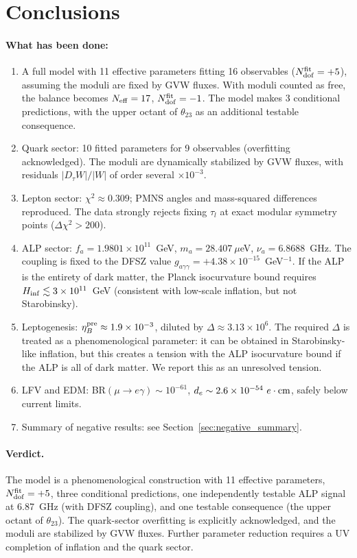 \documentclass[12pt,a4paper]{article}
\numberwithin{equation}{section}
\begin{document}
\section{Conclusions}
\paragraph{What has been done:}
\begin{enumerate}[leftmargin=1.5em]
\item A full model with 11 effective parameters fitting 16 observables (\(N_{\rm dof}^{\rm fit} = +5\)), assuming the moduli are fixed by GVW fluxes. With moduli counted as free, the balance becomes \(N_{\rm eff} = 17\), \(N_{\rm dof}^{\rm fit} = -1\). The model makes 3 conditional predictions, with the upper octant of \(\theta_{23}\) as an additional testable consequence.
\item Quark sector: 10 fitted parameters for 9 observables (overfitting acknowledged). The moduli are dynamically stabilized by GVW fluxes, with residuals \(|D_\tau W|/|W|\) of order several \(\times 10^{-3}\).
\item Lepton sector: \(\chi^2 \approx 0.309\); PMNS angles and mass-squared differences reproduced. The data strongly rejects fixing \(\tau_l\) at exact modular symmetry points (\(\Delta\chi^2 > 200\)).
\item ALP sector: \(f_a = 1.9801 \times 10^{11}\)~GeV, \(m_a = 28.407~\mu\)eV, \(\nu_a = 6.8688\)~GHz. The coupling is fixed to the DFSZ value \(g_{a\gamma\gamma} = +4.38 \times 10^{-15}\)~GeV\(^{-1}\). If the ALP is the entirety of dark matter, the Planck isocurvature bound requires \(H_{\rm inf} \lesssim 3 \times 10^{11}\)~GeV (consistent with low-scale inflation, but not Starobinsky).
\item Leptogenesis: \(\eta_B^{\rm pre} \approx 1.9\times10^{-3}\), diluted by \(\Delta \approx 3.13\times 10^6\). The required \(\Delta\) is treated as a phenomenological parameter: it can be obtained in Starobinsky-like inflation, but this creates a tension with the ALP isocurvature bound if the ALP is all of dark matter. We report this as an unresolved tension.
\item LFV and EDM: BR\((\mu\to e\gamma) \sim 10^{-61}\), \(d_e \sim 2.6\times 10^{-54}~e\cdot{\rm cm}\), safely below current limits.
\item Summary of negative results: see Section~\ref{sec:negative_summary}.
\end{enumerate}

\paragraph{Verdict.} The model is a phenomenological construction with 11 effective parameters, \(N_{\rm dof}^{\rm fit} = +5\), three conditional predictions, one independently testable ALP signal at 6.87~GHz (with DFSZ coupling), and one testable consequence (the upper octant of \(\theta_{23}\)). The quark-sector overfitting is explicitly acknowledged, and the moduli are stabilized by GVW fluxes. Further parameter reduction requires a UV completion of inflation and the quark sector.
\end{document}
